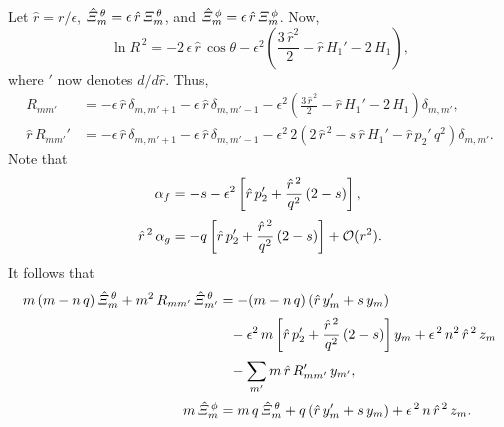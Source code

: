 \documentclass[12pt,prb,aps,notitlepage]{revtex4-1}
\begin{document}
Let $\hat{r}= r/\epsilon$, $\hat{\mit\Xi}_m^{\,\theta}= \epsilon\,\hat{r}\,{\mit\Xi}_m^{\,\theta}$, and $\hat{\mit\Xi}_m^{\,\phi}= \epsilon\,\hat{r}\,{\mit\Xi}_m^{\,\phi}$.
Now,
\begin{equation}
\ln R^{\,2} =- 2\,\epsilon\,\hat{r}\,\cos\theta -\epsilon^2\left(\frac{3\,\hat{r}^2}{\,2} -\hat{r}\,H_1' -2\,H_1\right),
\end{equation}
where $'$ now denotes $d/d\hat{r}$. Thus,
\begin{align}
R_{mm'} &= -\epsilon\,\hat{r}\,\delta_{m,m'+1}-\epsilon\,\hat{r}\,\delta_{m,m'-1} - \epsilon^2\left(\frac{3\,\hat{r}^{\,2}}{2} -\hat{r}\,H_1' -2\,H_1\right)\delta_{m,m'},\\[0.5ex]
\hat{r}\,R_{mm'}' &=  -\epsilon\,\hat{r}\,\delta_{m,m'+1}-\epsilon\,\hat{r}\,\delta_{m,m'-1} - \epsilon^2\,2\left(2\,\hat{r}^{\,2}-s\,\hat{r}\,H_1' -\hat{r}\,p_2'
\,q^2\right)\delta_{m,m'}.
\end{align}
Note that
\begin{align}
\alpha_f &= -s -\epsilon^2\left[\hat{r}\,p_2' + \frac{\hat{r}^{\,2}}{q^2}\,(2-s)\right],\\[0.5ex]
\hat{r}^{\,2}\,\alpha_g &=- q\left[\hat{r}\,p_2' + \frac{\hat{r}^{\,2}}{q^2}\,(2-s)\right]+{\cal O}(r^2).
\end{align}
It follows that
\begin{align}
m\,(m-n\,q)\,\hat{\mit\Xi}_m^{\,\theta} + m^2\,R_{mm'}\,\hat{\mit\Xi}_{m'}^{\,\theta} &= - (m-n\,q)\,(\hat{r}\,y_m' + s\,y_m)\nonumber\\[0.5ex]
&\phantom{=}-
\epsilon^2\,m\left[\hat{r}\,p_2' + \frac{\hat{r}^{\,2}}{q^2}\,(2-s)\right]y_m + \epsilon^{\,2}\,n^2\,\hat{r}^{\,2}\,z_m\nonumber\\[0.5ex]&\phantom{=}-
\sum_{m'}m\,\hat{r}\,R_{mm'}'\,y_{m'},\\[0.5ex]
m\,\hat{\mit\Xi}_m^{\,\phi} &= m\,q\,\hat{\mit\Xi}_m^{\,\theta} + q\,(\hat{r}\,y_m' +s\,y_m) + \epsilon^{\,2}\,n\,\hat{r}^{\,2}\,z_m.
\end{align}
\end{document}
